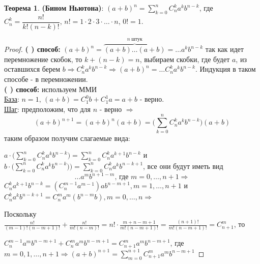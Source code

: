 \documentclass[12pt]{article}
\newcommand{\RN}[1]{%
	\textup{\uppercase\expandafter{\romannumeral#1}}%
}
\theoremstyle{definition}
\newtheorem{theorem}{Теорема}
\begin{document}
\begin{theorem}
\textbf{(Бином Ньютона)}: $(a+b)^n = \sum\limits_{k = 0}^n C_n^k a^kb^{n-k}$, где $C_n^k = \dfrac{n!}{k!(n-k)!}$, $n! = 1\cdot2\cdot3\cdot \dotsc \cdot n$, $0! = 1$.
\end{theorem}
\begin{proof}\hfill
	
	\textbf{(\RN{1}) способ:} $(a+b)^n = \overbrace{(a+b) \dotsc (a+b)}^{n \; \text{штук}} = \dotsc a^kb^{n-k}$ так как идет перемножение скобок, то $k + (n-k) = n$, выбираем скобки, где будет $a$, из оставшихся берем $b \Rightarrow C_n^k a^k b^{n-k} \Rightarrow (a+b)^n = \dotsc C_n^k a^k b^{n-k}$. Индукция в таком способе - в перемножении.\\
	
	\textbf{(\RN{2}) способ:} используем ММИ \\
	\uline{База}: $n = 1,\, (a+b) = C_1^0 b + C_1^1 a = a + b$ - верно.\\
	\uline{Шаг}: предположим, что для $n$ - верно $\Rightarrow$ 
	$$(a+b)^{n+1} = (a+b)^n(a+b) = \big(\sum\limits_{k=0}^nC_n^ka^kb^{n-k}\big)(a+b)$$ таким образом получим слагаемые вида: 
	
	$a\cdot \big(\sum\limits_{k=0}^nC_n^ka^kb^{n-k}\big) = \sum\limits_{k=0}^nC_n^ka^{k+1}b^{n-k}$ и $b\cdot \big(\sum\limits_{k=0}^nC_n^ka^kb^{n-k}\big)) = \sum\limits_{k=0}^nC_n^ka^kb^{n-k+1}$, все они будут иметь вид $$\dotsc a^mb^{n+1-m}\text{, где }m = 0,\dotsc, n+1 \Rightarrow $$  
	$C_n^ka^{k+1}b^{n-k} = (C_n^{m-1} a^{m-1})ab^{n-m+1}, m = 1,\dotsc, n+1$ и $C_n^ka^kb^{n-k+1} = C_n^ma^m(b^{n-m}b), m = 0,\dotsc,n \Rightarrow$
	
	Поскольку $\frac{n!}{(m-1)!(n-m+1)!} + \frac{n!}{m!(n-m)!} = n!\cdot \frac{m + n - m + 1}{m!(n-m+1)!} = \frac{(n+1)!}{m!(n-m+1)!} = C_{n+1}^m$, то
	
	$C_n^{m-1}a^mb^{n-m+1} + C_n^m a^mb^{n-m+1} = C_{n+1}^m a^m b^{n-m+1}$, где $m = 0, 1, \dotsc, n+1 \Rightarrow (a+b)^{n+1} = \sum\limits_{m = 0}^{n+1}C_{n+1}^m a^m b^{n-m+1}$
\end{proof}
\end{document}
